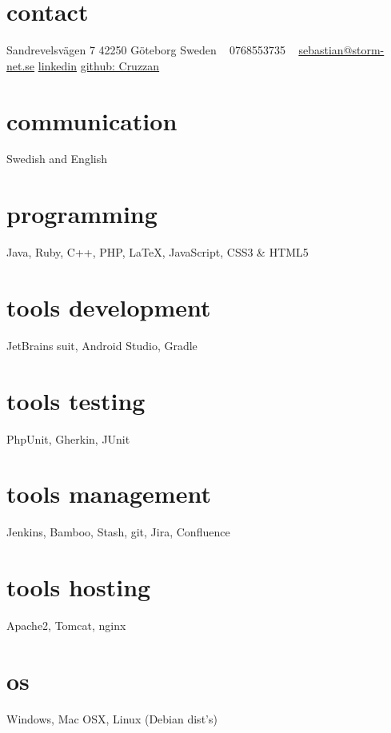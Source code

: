 \documentclass[]{friggeri-cv} %
\begin{document}


\begin{aside} %
\section{contact}
Sandrevelsvägen 7
42250 Göteborg
Sweden
~
0768553735
~
\href{mailto:sebastian@storm-net.se}{sebastian@storm-net.se}
\href{https://se.linkedin.com/pub/sebastian-hultstrand/60/51a/151}{linkedin}
\href{https://github.com/cruzzan}{github: Cruzzan}
\section{communication}
Swedish and English
\section{programming}
Java, Ruby, C++, PHP, LaTeX, JavaScript, CSS3 \& HTML5
\section{tools development}
JetBrains suit, Android Studio, Gradle
\section{tools testing}
PhpUnit, Gherkin, JUnit
\section{tools management}
Jenkins, Bamboo, Stash, git, Jira, Confluence
\section{tools hosting}
Apache2, Tomcat, nginx
\section{os}
Windows, Mac OSX, Linux (Debian dist's)
\end{aside}

\end{document}
